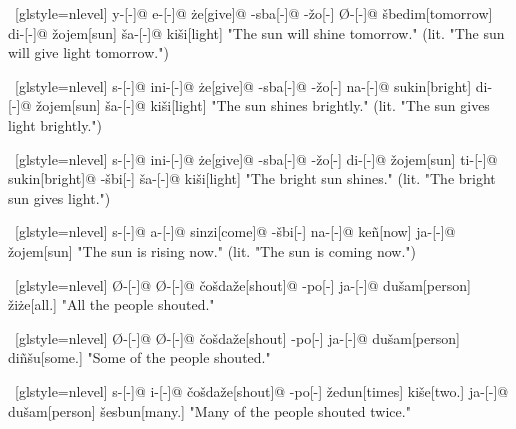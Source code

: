 \ex~[glstyle=nlevel]
\begingl
\glpreamble {}
\endpreamble
y-[{\Sjv}-]@
e-[{\Pfv}-]@
\.{z}e[give]@
-sba[-{\Inan}]@
-\v{z}o[-{\Inan}]
Ø-[{\Pfv}-]@
\v{s}bedim[tomorrow]
di-[{\Erg}-]@
\v{z}ojem[sun]
\v{s}a-[{\Acc}-]@
ki\v{s}i[light]
\glft "The sun will shine tomorrow." (lit. "The sun will give light tomorrow.")
\endgl
\xe

\ex~[glstyle=nlevel]
\begingl
\glpreamble {}
\endpreamble
s-[{\Ind}-]@
ini-[{\Hab}-]@
\.{z}e[give]@
-sba[-{\Inan}]@
-\v{z}o[-{\Inan}]
na-[{\Prog}-]@
sukin[bright]
di-[{\Erg}-]@
\v{z}ojem[sun]
\v{s}a-[{\Acc}-]@
ki\v{s}i[light]
\glft "The sun shines brightly." (lit. "The sun gives light brightly.")
\endgl
\xe

\ex~[glstyle=nlevel]
\begingl
\glpreamble {}
\endpreamble
s-[{\Ind}-]@
ini-[{\Hab}-]@
\.{z}e[give]@
-sba[-{\Inan}]@
-\v{z}o[-{\Inan}]
di-[{\Erg}-]@
\v{z}ojem[sun]
ti-[{\Erg}-]@
sukin[bright]@
-\v{s}bi[-{\Inan}]
\v{s}a-[{\Acc}-]@
ki\v{s}i[light]
\glft "The bright sun shines." (lit. "The bright sun gives light.")
\endgl
\xe

\ex~[glstyle=nlevel]
\begingl
\glpreamble {}
\endpreamble
s-[{\Ind}-]@
a-[{\Prog}-]@
sinzi[come]@
-\v{s}bi[-{\Inan}]
na-[{\Prog}-]@
keñ[now]
ja-[{\Nom}-]@
\v{z}ojem[sun]
\glft "The sun is rising now." (lit. "The sun is coming now.")
\endgl
\xe

\ex~[glstyle=nlevel]
\begingl
\glpreamble {}
\endpreamble
Ø-[{\Ind}-]@
Ø-[{\Pfv}-]@
\v{c}o\v{s}da\v{z}e[shout]@
-po[-{\Hg}]
ja-[{\Nom}-]@
du\v{s}am[person]
\v{z}i\.{z}e[all.{\Hg}]
\glft "All the people shouted."
\endgl
\xe

\ex~[glstyle=nlevel]
\begingl
\glpreamble {}
\endpreamble
Ø-[{\Ind}-]@
Ø-[{\Pfv}-]@
\v{c}o\v{s}da\v{z}e[shout]
-po[-{\Hg}]
ja-[{\Nom}-]@
du\v{s}am[person]
diñ\v{s}u[some.{\Hg}]
\glft "Some of the people shouted."
\endgl
\xe

\ex~[glstyle=nlevel]
\begingl
\glpreamble {}
\endpreamble
s-[{\Ind}-]@
i-[{\Iter}-]@
\v{c}o\v{s}da\v{z}e[shout]@
-po[-{\Hg}]
\v{z}edun[times]
ki\v{s}e[two.{\Inan}]
ja-[{\Nom}-]@
du\v{s}am[person]
\v{s}esbun[many.{\Hg}]
\glft "Many of the people shouted twice."
\endgl
\xe

